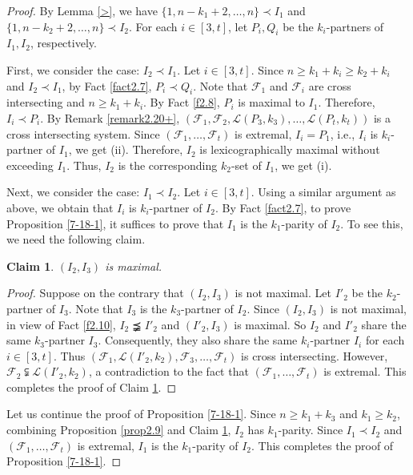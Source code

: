 \documentclass[a4paper,11pt]{article}
\newtheorem{claim}[theorem]{Claim}
\begin{document}
\begin{proof}
By Lemma \ref{>}, we have $\{1, n-k_1+2, \dots, n\} \prec I_1$ and $\{1, n-k_2+2, \dots, n\} \prec I_2$.
For each $i\in [3, t]$,  let $P_i, Q_i$ be the $k_i$-partners of $I_1, I_2$, respectively.

First, we consider the case: $I_2\prec I_1$.
Let $i\in [3, t]$.
Since $n\geq k_1+k_i\geq k_2+k_i$ and $I_2\prec I_1$,
 by  Fact \ref{fact2.7}, $P_i\prec Q_i$. Note that $\mathcal{F}_1$ and $\mathcal{F}_i$ are cross intersecting and  $n\geq k_1+k_i$. By Fact \ref{f2.8}, $P_i$ is maximal to $I_1$. Therefore, $I_i\prec P_i$.
 By Remark \ref{remark2.20+}, $(\mathcal{F}_1, \mathcal{F}_2, \mathcal{L}(P_3, k_3), \dots, \mathcal{L}(P_t, k_t))$ is a cross intersecting system.
 Since
 $(\mathcal{F}_1, \dots, \mathcal{F}_t)$ is extremal, $I_i= P_1$, i.e., $I_i$ is $k_i$-partner of $I_1$, we get (ii). Therefore, $I_2$ is lexicographically maximal without exceeding $I_1$. Thus, $I_2$ is the corresponding $k_2$-set of $I_1$, we get (i).

Next, we consider the case: $I_1\prec I_2$.
Let $i\in [3, t]$.
Using a similar argument as above, we obtain that $I_i$ is $k_i$-partner of $I_2$.
By Fact \ref{fact2.7}, to prove Proposition \ref{7-18-1}, it suffices to prove that $I_1$ is the $k_1$-parity of $I_2$. To see this, we need the following claim.
\begin{claim}\label{7-18-2}
$(I_2, I_3)$ is maximal.
\end{claim}

\begin{proof}
Suppose on the contrary that  $(I_2, I_3)$ is not maximal.
Let $I'_2$ be the $k_2$-partner of $I_3$.
Note that $I_3$ is the $k_3$-partner of $I_2$.
Since $(I_2, I_3)$ is not maximal, in view of Fact \ref{f2.10},
$I_2\precneqq I'_2$ and $(I'_2, I_3)$ is maximal. So $I_2$ and $I'_2$ share the  same $k_3$-partner $I_3$. Consequently, they also share the  same $k_i$-partner $I_i$ for each $i\in [3, t]$.
Thus $(\mathcal{F}_1, \mathcal{L}(I'_2, k_2), \mathcal{F}_3, \dots, \mathcal{F}_t)$ is cross intersecting. However, $\mathcal{F}_2 \subsetneqq \mathcal{L}(I'_2, k_2)$, a contradiction to the fact that $(\mathcal{F}_1, \dots, \mathcal{F}_t)$ is extremal. This completes the proof of Claim \ref{7-18-2}.
\end{proof}

Let us continue the proof of Proposition \ref{7-18-1}.
Since $n\geq k_1+k_3$ and $k_1\geq k_2$, combining Proposition \ref{prop2.9}
and Claim \ref{7-18-2}, $I_2$ has $k_1$-parity. Since $I_1\prec I_2$ and $(\mathcal{F}_1, \dots, \mathcal{F}_t)$ is extremal, $I_1$ is the $k_1$-parity of $I_2$. This completes the proof of Proposition \ref{7-18-1}.
\end{proof}
\end{document}
